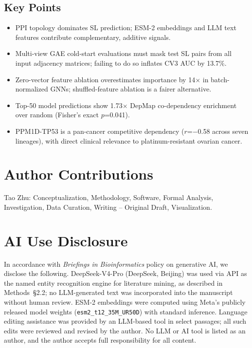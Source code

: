 \documentclass[12pt,a4paper]{article}
\begin{document}
\subsection*{Key Points}
\begin{itemize}[nosep]
    \item PPI topology dominates SL prediction; ESM-2 embeddings and LLM text features contribute complementary, additive signals.
    \item Multi-view GAE cold-start evaluations must mask test SL pairs from all input adjacency matrices; failing to do so inflates CV3 AUC by 13.7\%.
    \item Zero-vector feature ablation overestimates importance by 14$\times$ in batch-normalized GNNs; shuffled-feature ablation is a fairer alternative.
    \item Top-50 model predictions show 1.73$\times$ DepMap co-dependency enrichment over random (Fisher's exact $p$=0.041).
    \item PPM1D-TP53 is a pan-cancer competitive dependency ($r$=$-$0.58 across seven lineages), with direct clinical relevance to platinum-resistant ovarian cancer.
\end{itemize}

\section*{Author Contributions}

Tao Zhu: Conceptualization, Methodology, Software, Formal Analysis, Investigation, Data Curation, Writing -- Original Draft, Visualization.

\section*{AI Use Disclosure}

In accordance with \textit{Briefings in Bioinformatics} policy on generative AI, we disclose the following. DeepSeek-V4-Pro (DeepSeek, Beijing) was used via API as the named entity recognition engine for literature mining, as described in Methods~\S2.2; no LLM-generated text was incorporated into the manuscript without human review. ESM-2 embeddings were computed using Meta's publicly released model weights (\texttt{esm2\_t12\_35M\_UR50D}) with standard inference. Language editing assistance was provided by an LLM-based tool in select passages; all such edits were reviewed and revised by the author. No LLM or AI tool is listed as an author, and the author accepts full responsibility for all content.
\end{document}
